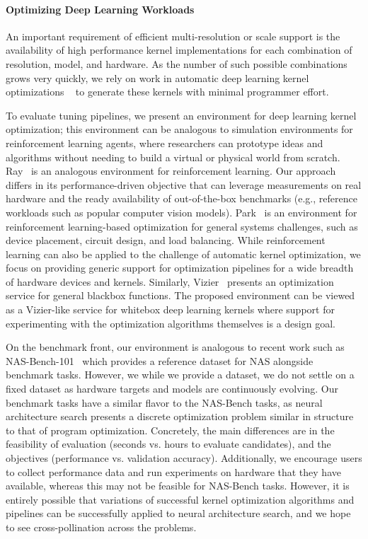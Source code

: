 \paragraph{Optimizing Deep Learning Workloads}
An important requirement of efficient multi-resolution or scale support is the availability of high performance kernel implementations for each combination of resolution, model, and hardware.
As the number of such possible combinations grows very quickly, we rely on work in automatic deep learning kernel optimizations ~\cite{ragan2013halide, chen2018tvm, zheng2020ansor, cowan2020automatic} to generate these kernels with minimal programmer effort.

To evaluate tuning pipelines, we present an environment for deep learning kernel optimization; this environment can be analogous to simulation environments for reinforcement learning agents, where researchers can prototype ideas and algorithms without needing to build a virtual or physical world from scratch.
Ray~\cite{222605} is an analogous environment for reinforcement learning.
Our approach differs in its performance-driven objective that can leverage measurements on real hardware and the ready availability of out-of-the-box benchmarks (e.g., reference workloads such as popular computer vision models).
Park~\cite{mao2019park} is an environment for reinforcement learning-based optimization for general systems challenges, such as device placement, circuit design, and load balancing.
While reinforcement learning can also be applied to the challenge of automatic kernel optimization, we focus on providing generic support for optimization pipelines for a wide breadth of hardware devices and kernels.
Similarly, Vizier~\cite{golovin2017google} presents an optimization service for general blackbox functions.
The proposed environment can be viewed as a Vizier-like service for whitebox deep learning kernels where support for experimenting with the optimization algorithms themselves is a design goal.


On the benchmark front, our environment is analogous to recent work such as NAS-Bench-101~\cite{pmlr-v97-ying19a} which provides a reference dataset for NAS alongside benchmark tasks.
However, we while we provide a dataset, we do not settle on a fixed dataset as hardware targets and models are continuously evolving.
Our benchmark tasks have a similar flavor to the NAS-Bench tasks, as neural architecture search presents a discrete optimization problem similar in structure to that of program optimization.
Concretely, the main differences are in the feasibility of evaluation (seconds vs. hours to evaluate candidates), and the objectives (performance vs. validation accuracy).
Additionally, we encourage users to collect performance data and run experiments on hardware that they have available, whereas this may not be feasible for NAS-Bench tasks.
However, it is entirely possible that variations of successful kernel optimization algorithms and pipelines can be successfully applied to neural architecture search, and we hope to see cross-pollination across the problems.


